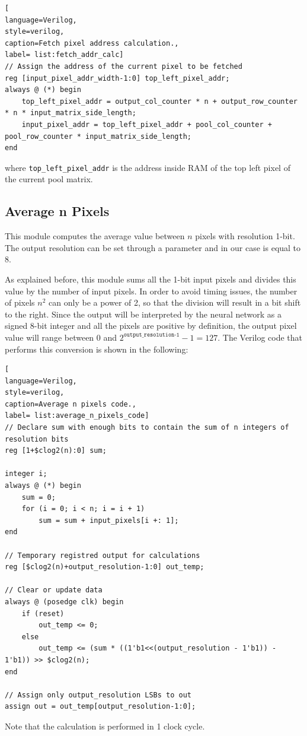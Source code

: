 \documentclass[11pt]{report}
\begin{document}
\begin{lstlisting}[
language=Verilog,
style=verilog,
caption=Fetch pixel address calculation.,
label= list:fetch_addr_calc]
// Assign the address of the current pixel to be fetched
reg [input_pixel_addr_width-1:0] top_left_pixel_addr;
always @ (*) begin
    top_left_pixel_addr = output_col_counter * n + output_row_counter * n * input_matrix_side_length;
    input_pixel_addr = top_left_pixel_addr + pool_col_counter + pool_row_counter * input_matrix_side_length;
end
\end{lstlisting}
where \texttt{top\_left\_pixel\_addr} is the address inside RAM of the top left pixel of the current pool matrix.

\subsection{Average n Pixels}
This module computes the average value between $n$ pixels with resolution 1-bit. The output resolution can be set through a parameter and in our case is equal to 8.

As explained before, this module sums all the 1-bit input pixels and divides this value by the number of input pixels. In order to avoid timing issues, the number of pixels $n^2$ can only be a power of 2, so that the division will result in a bit shift to the right. Since the output will be interpreted by the neural network as a signed 8-bit integer and all the pixels are positive by definition, the output pixel value will range between 0 and $2^{\texttt{output\_resolution-1}}-1=127$. The Verilog code that performs this conversion is shown in the following:

\begin{lstlisting}[
language=Verilog,
style=verilog,
caption=Average n pixels code.,
label= list:average_n_pixels_code]
// Declare sum with enough bits to contain the sum of n integers of resolution bits
reg [1+$clog2(n):0] sum;

integer i;
always @ (*) begin
    sum = 0;
    for (i = 0; i < n; i = i + 1)
        sum = sum + input_pixels[i +: 1];
end

// Temporary registred output for calculations
reg [$clog2(n)+output_resolution-1:0] out_temp;
   
// Clear or update data
always @ (posedge clk) begin
	if (reset)
		out_temp <= 0;
	else
        out_temp <= (sum * ((1'b1<<(output_resolution - 1'b1)) - 1'b1)) >> $clog2(n);
end
	
// Assign only output_resolution LSBs to out
assign out = out_temp[output_resolution-1:0];
\end{lstlisting}
Note that the calculation is performed in 1 clock cycle.
\end{document}
